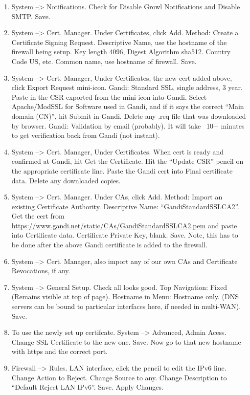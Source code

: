 \begin{enumerate}
 \item System --> Notifications. Check for Disable Growl Notifications and Disable SMTP. Save.
 \item System --> Cert. Manager. Under Certificates, click Add. Method: Create a Certificate Signing Request. Descriptive Name, use the hostname of the firewall being setup. Key length 4096, Digest Algorithm sha512. Country Code US, etc. Common name, use hostname of firewall. Save.
 \item System --> Cert. Manager, Under Certificates, the new cert added above, click Export Request mini-icon. Gandi: Standard SSL, single address, 3 year. Paste in the CSR exported from the mini-icon into Gandi. Select Apache/ModSSL for Software used in Gandi, and if it says the correct ``Main domain (CN)'', hit Submit in Gandi. Delete any .req file that was downloaded by browser. Gandi: Validation by email (probably). It will take ~10+ minutes to get verification back from Gandi (not instant).
 \item System --> Cert. Manager, Under Certificates. When cert is ready and confirmed at Gandi, hit Get the Certificate. Hit the ``Update CSR'' pencil on the appropriate certificate line. Paste the Gandi cert into Final certificate data. Delete any downloaded copies.
 \item System --> Cert. Manager. Under CAs, click Add. Method: Import an existing Certificate Authority. Descriptive Name: ``GandiStandardSSLCA2''. Get the cert from \url{https://www.gandi.net/static/CAs/GandiStandardSSLCA2.pem} and paste into Certificate data. Certificate Private Key, blank. Save. Note, this has to be done after the above Gandi certificate is added to the firewall.
 \item System --> Cert. Manager, also import any of our own CAs and Certificate Revocations, if any.
 \item System --> General Setup. Check all looks good. Top Navigation: Fixed (Remains visible at top of page). Hostname in Menu: Hostname only. (DNS servers can be bound to particular interfaces here, if needed in multi-WAN). Save.
 \item To use the newly set up certifcate. System --> Advanced, Admin Acess. Change SSL Certificate to the new one. Save. Now go to that new hostname with https and the correct port.
 \item Firewall --> Rules. LAN interface, click the pencil to edit the IPv6 line. Change Action to Reject. Change Source to any. Change Description to ``Default Reject LAN IPv6''. Save. Apply Changes.

\end{enumerate}
